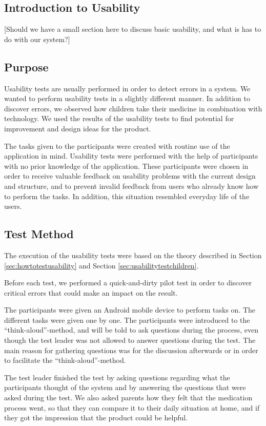 
\subsection{Introduction to Usability}
[Should we have a small section here to discuss basic usability, and what is has to do with our system?]

\subsection{Purpose}
\label{sec:usabilitypurpose}
Usability tests are usually performed in order to detect errors in a system. We wanted to perform usability tests in a slightly different manner. In addition to discover errors, we observed how children take their medicine in combination with technology. We used the results of the usability tests to find potential for improvement and design ideas for  the product.
 
The tasks given to the participants were created with routine use of the application in mind. Usability tests were performed with the help of participants with no prior knowledge of the application. These participants were chosen in order to receive valuable feedback on usability problems with the current design and structure, and to prevent invalid feedback from users who already know how to perform the tasks. In addition, this situation resembled everyday life of the users.


\subsection{Test Method}
\label{sec:testmethod}
The execution of the usability tests were based on the theory described in Section \ref{sec:howtotestusability} and Section \ref{sec:usabilitytestchildren}.

Before each test, we performed a quick-and-dirty pilot test in order to discover critical errors that could make an impact on the result.

The participants were given an Android mobile device to perform tasks on. The different tasks were given one by one. The participants were introduced to the ``think-aloud''-method, and will be told to ask questions during the process, even though the test leader was not allowed to answer questions during the test. The main reason for gathering questions was for the discussion afterwards or in order to facilitate the ``think-aloud''-method. 

The test leader finished the test by asking questions regarding what the participants thought of the system and by answering the questions that were asked during the test. We also asked parents how they felt that the medication process went, so that they can compare it to their daily situation at home, and if they got the impression that the product could be helpful.  

